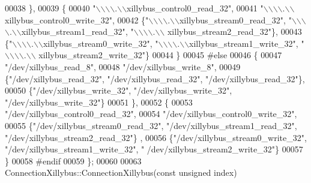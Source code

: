 \begin{DoxyCode}
00038     \},
00039     \{
00040         \textcolor{stringliteral}{"\(\backslash\)\(\backslash\)\(\backslash\)\(\backslash\).\(\backslash\)\(\backslash\)xillybus\_control0\_read\_32"},
00041         \textcolor{stringliteral}{"\(\backslash\)\(\backslash\)\(\backslash\)\(\backslash\).\(\backslash\)\(\backslash\)xillybus\_control0\_write\_32"},
00042         \{\textcolor{stringliteral}{"\(\backslash\)\(\backslash\)\(\backslash\)\(\backslash\).\(\backslash\)\(\backslash\)xillybus\_stream0\_read\_32"}, \textcolor{stringliteral}{"\(\backslash\)\(\backslash\)\(\backslash\)\(\backslash\).\(\backslash\)\(\backslash\)xillybus\_stream1\_read\_32"}, \textcolor{stringliteral}{"\(\backslash\)\(\backslash\)\(\backslash\)\(\backslash\).\(\backslash\)\(\backslash\)
      xillybus\_stream2\_read\_32"}\},
00043         \{\textcolor{stringliteral}{"\(\backslash\)\(\backslash\)\(\backslash\)\(\backslash\).\(\backslash\)\(\backslash\)xillybus\_stream0\_write\_32"}, \textcolor{stringliteral}{"\(\backslash\)\(\backslash\)\(\backslash\)\(\backslash\).\(\backslash\)\(\backslash\)xillybus\_stream1\_write\_32"}, \textcolor{stringliteral}{"\(\backslash\)\(\backslash\)\(\backslash\)\(\backslash\).\(\backslash\)\(\backslash\)
      xillybus\_stream2\_write\_32"}\}
00044     \}
00045 \textcolor{preprocessor}{#else}
00046     \{
00047         \textcolor{stringliteral}{"/dev/xillybus\_read\_8"},
00048         \textcolor{stringliteral}{"/dev/xillybus\_write\_8"},
00049         \{\textcolor{stringliteral}{"/dev/xillybus\_read\_32"}, \textcolor{stringliteral}{"/dev/xillybus\_read\_32"}, \textcolor{stringliteral}{"/dev/xillybus\_read\_32"}\},
00050         \{\textcolor{stringliteral}{"/dev/xillybus\_write\_32"}, \textcolor{stringliteral}{"/dev/xillybus\_write\_32"}, \textcolor{stringliteral}{"/dev/xillybus\_write\_32"}\}
00051     \},
00052     \{
00053         \textcolor{stringliteral}{"/dev/xillybus\_control0\_read\_32"},
00054         \textcolor{stringliteral}{"/dev/xillybus\_control0\_write\_32"},
00055         \{\textcolor{stringliteral}{"/dev/xillybus\_stream0\_read\_32"}, \textcolor{stringliteral}{"/dev/xillybus\_stream1\_read\_32"}, \textcolor{stringliteral}{"/dev/xillybus\_stream2\_read\_32"}\}
      ,
00056         \{\textcolor{stringliteral}{"/dev/xillybus\_stream0\_write\_32"}, \textcolor{stringliteral}{"/dev/xillybus\_stream1\_write\_32"}, \textcolor{stringliteral}{"
      /dev/xillybus\_stream2\_write\_32"}\}
00057     \}
00058 \textcolor{preprocessor}{#endif}
00059 \};
00060 
00063 ConnectionXillybus::ConnectionXillybus(\textcolor{keyword}{const} \textcolor{keywordtype}{unsigned} index)

\end{DoxyCode}
